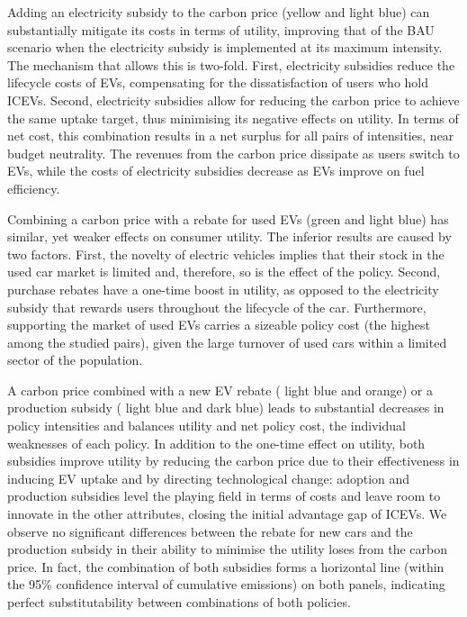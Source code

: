 \documentclass[12pt]{article}
\begin{document}
    Adding an electricity subsidy to the carbon price (yellow and light blue) can substantially mitigate its costs in terms of utility, improving that of the BAU scenario when the electricity subsidy is implemented at its maximum intensity. The mechanism that allows this is two-fold. First, electricity subsidies reduce the lifecycle costs of EVs, compensating for the dissatisfaction of users who hold ICEVs. Second, electricity subsidies allow for reducing the carbon price to achieve the same uptake target, thus minimising its negative effects on utility. In terms of net cost, this combination results in a net surplus for all pairs of intensities, near budget neutrality. The revenues from the carbon price dissipate as users switch to EVs, while the costs of electricity subsidies decrease as EVs improve on fuel efficiency.

	Combining a carbon price with a rebate for used EVs (green and light blue) has similar, yet weaker effects on consumer utility. The inferior results are caused by two factors. First, the novelty of electric vehicles implies that their stock in the used car market is limited and, therefore, so is the effect of the policy. Second, purchase rebates have a one-time boost in utility, as opposed to the electricity subsidy that rewards users throughout the lifecycle of the car. Furthermore, supporting the market of used EVs carries a sizeable policy cost (the highest among the studied pairs), given the large turnover of used cars within a limited sector of the population.

    A carbon price combined with a new EV rebate ( light blue and orange) or a production subsidy ( light blue and dark blue) leads to substantial decreases in policy intensities and balances utility and net policy cost, the individual weaknesses of each policy. In addition to the one-time effect on utility, both subsidies improve utility by reducing the carbon price due to their effectiveness in inducing EV uptake and by directing  technological change: adoption and production subsidies level the playing field in terms of costs and leave room to innovate in the other attributes, closing the initial advantage gap of ICEVs. We observe no significant differences between the rebate for new cars and the production subsidy in their ability to minimise the utility loses from the carbon price. In fact, the combination of both subsidies forms a horizontal line (within the 95\% confidence interval of cumulative emissions) on both panels, indicating perfect substitutability between combinations of both policies.
\end{document}

